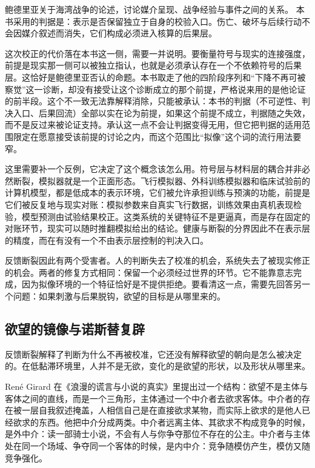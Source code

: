 
鲍德里亚关于海湾战争的论述，讨论媒介呈现、战争经验与事件之间的关系。\cite{baudrillard1991gulf} 本书采用的判据是：表示是否保留独立于自身的校验入口。伤亡、破坏与后续行动不会因媒介叙述而消失，它们构成必须进入核算的后果层。

这次校正的代价落在本书这一侧，需要一并说明。要衡量符号与现实的连接强度，前提是现实那一侧可以被独立指认，也就是必须承认存在一个不依赖符号的后果层。这恰好是鲍德里亚否认的命题。本书取走了他的四阶段序列和“下降不再可被察觉”这一诊断，却没有接受让这个诊断成立的那个前提，严格说来用的是他论证的前半段。这个不一致无法靠解释消除，只能被承认：本书的判据（不可逆性、判决入口、后果回流）全部以实在论为前提，如果这个前提不成立，判据随之失效，而不是反过来被论证支持。承认这一点不会让判据变得无用，但它把判据的适用范围限定在愿意接受该前提的讨论之内，而这个范围比“拟像”这个词的流行用法要窄。

这里需要补一个反例，它决定了这个概念该怎么用。符号层与材料层的耦合并非必然断裂，模拟器就是一个正面形态。飞行模拟器、外科训练模拟器和临床试验前的计算机模型，都是低成本的表示环境，它们被允许承担训练与预演的功能，前提是它们被反复地与现实对账：模拟参数来自真实飞行数据，训练效果由真机表现检验，模型预测由试验结果校正。这类系统的关键特征不是更逼真，而是存在固定的对账环节，现实可以随时推翻模拟给出的结论。健康与断裂的分界因此不在表示层的精度，而在有没有一个不由表示层控制的判决入口。

反馈断裂因此有两个受害者。人的判断失去了校准的机会，系统失去了被现实修正的机会。两者的修复方式相同：保留一个必须经过世界的环节。它不能靠意志完成，因为拟像环境的一个特征恰好是不提供拒绝。要看清这一点，需要先回答另一个问题：如果刺激与后果脱钩，欲望的目标是从哪里来的。

\subsection{欲望的镜像与诺斯替复辟}

反馈断裂解释了判断为什么不再被校准，它还没有解释欲望的朝向是怎么被决定的。在低黏滞环境里，人并不是无欲，变化的是欲望的形状，以及形状从哪里来。


Ren{\'e} Girard 在《浪漫的谎言与小说的真实》里提出过一个结构：欲望不是主体与客体之间的直线，而是一个三角形，主体通过一个中介者去欲求客体\cite{girard1961mensonge}。中介者的存在被一层自我叙述掩盖，人相信自己是在直接欲求某物，而实际上欲求的是他人已经欲求的东西。他把中介分成两类。中介者远离主体、其欲求不构成竞争的时候，是外中介：读一部骑士小说，不会有人与你争夺那位不存在的公主。中介者与主体处在同一个场域、争夺同一个客体的时候，是内中介：竞争随模仿产生，模仿又随竞争强化。

